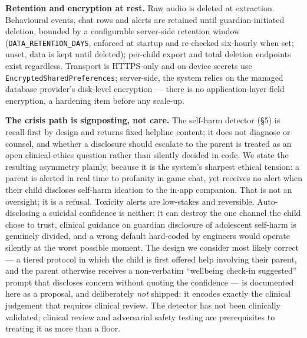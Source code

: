\documentclass[11pt,a4paper]{article}
\begin{document}
\textbf{Retention and encryption at rest.} Raw audio is deleted at
extraction. Behavioural events, chat rows and alerts are retained until
guardian-initiated deletion, bounded by a configurable server-side retention
window (\texttt{DATA\_RETENTION\_DAYS}, enforced at startup and re-checked
six-hourly when set; unset, data is kept until deleted); per-child export and
total deletion endpoints exist regardless. Transport is HTTPS-only and
on-device secrets use \texttt{EncryptedSharedPreferences}; server-side, the
system relies on the managed database provider's disk-level encryption ---
there is no application-layer field encryption, a hardening item before any
scale-up.

\textbf{The crisis path is signposting, not care.} The self-harm detector
(\S5) is recall-first by design and returns fixed helpline content; it does
not diagnose or counsel, and whether a disclosure should escalate to the
parent is treated as an open clinical-ethics question rather than silently
decided in code. We state the resulting asymmetry plainly, because it is the
system's sharpest ethical tension: a parent is alerted in real time to
profanity in game chat, yet receives no alert when their child discloses
self-harm ideation to the in-app companion. That is not an oversight; it is a
refusal. Toxicity alerts are low-stakes and reversible. Auto-disclosing a
suicidal confidence is neither: it can destroy the one channel the child
chose to trust, clinical guidance on guardian disclosure of adolescent
self-harm is genuinely divided, and a wrong default hard-coded by engineers
would operate silently at the worst possible moment. The design we consider
most likely correct --- a tiered protocol in which the child is first offered
help involving their parent, and the parent otherwise receives a
non-verbatim ``wellbeing check-in suggested'' prompt that discloses concern
without quoting the confidence --- is documented here as a proposal, and
deliberately \emph{not} shipped: it encodes exactly the clinical judgement
that requires clinical review. The detector has not been clinically
validated; clinical review and adversarial safety testing are prerequisites
to treating it as more than a floor.
\end{document}
